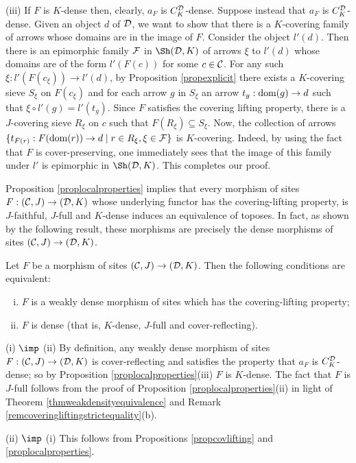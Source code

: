 \documentclass[a4paper,12pt]{article}
\begin{document}
\begin{proofs}
	(iii) If $F$ is $K$-dense then, clearly, $a_{F}$ is $C^{\cal D}_{K}$-dense. Suppose instead that $a_{F}$ is $C^{\cal D}_{K}$-dense. Given an object $d$ of $\cal D$, we want to show that there is a $K$-covering family of arrows whose domains are in the image of $F$. Consider the object $l'(d)$. Then there is an epimorphic family $\cal F$ in $\Sh({\cal D}, K)$ of arrows $\xi$ to $l'(d)$ whose domains are of the form $l'(F(c))$ for some $c\in {\cal C}$. For any such $\xi:l'(F(c_{\xi}))\to l'(d)$, by Proposition \ref{propexplicit} there exists a $K$-covering sieve $S_{\xi}$ on $F(c_{\xi})$ and for each arrow $g$ in $S_{\xi}$ an arrow $t_{g}:\textup{dom}(g)\to d$ such that $\xi\circ l'(g)=l'(t_{g})$. Since $F$ satisfies the covering lifting property, there is a $J$-covering sieve $R_{\xi}$ on $c$ such that $F(R_{\xi})\subseteq S_{\xi}$. Now, the collection of arrows  $\{t_{F(r)}:F(\textup{dom}(r))\to d \mid r\in R_{\xi}, \xi\in {\cal F}\}$ is $K$-covering. Indeed, by using the fact that $F$ is cover-preserving, one immediately sees that the image of this family under $l'$ is epimorphic in $\Sh({\cal D}, K)$. This completes our proof. 
\end{proofs}

\begin{remark}
Proposition \ref{proplocalproperties} implies that every morphism of sites $F:({\cal C}, J)\to ({\cal D}, K)$ whose underlying functor has the covering-lifting property, is $J$-faithful, $J$-full and $K$-dense induces an equivalence of toposes. In fact, as shown by the following result, these morphisms are precisely the dense morphisms of sites $({\cal C}, J)\to ({\cal D}, K)$.	
\end{remark}

\begin{corollary}\label{corequivalencecovliftproperty}
	Let $F$ be a morphism of sites $({\cal C}, J)\to ({\cal D}, K)$. Then the following conditions are equivalent:
	\begin{enumerate}[(i)]
		\item $F$ is a weakly dense morphism of sites which has the covering-lifting property;
		
		\item $F$ is dense (that is, $K$-dense, $J$-full and cover-reflecting).
	\end{enumerate}
	
\end{corollary}

\begin{proofs}
	(i) $\imp$ (ii)  By definition, any weakly dense morphism of sites $F:({\cal C}, J)\to ({\cal D}, K)$ is cover-reflecting and satisfies the property that $a_{F}$ is $C^{\cal D}_{K}$-dense; so by Proposition \ref{proplocalproperties}(iii) $F$ is $K$-dense. The fact that $F$ is $J$-full follows from the proof of Proposition \ref{proplocalproperties}(ii) in light of Theorem \ref{thmweakdensityequivalence} and Remark \ref{remcoveringliftingstrictequality}(b).
	
	(ii) $\imp$ (i) This follows from Propositions \ref{propcovlifting} and \ref{proplocalproperties}.   
\end{proofs}
\end{document}
